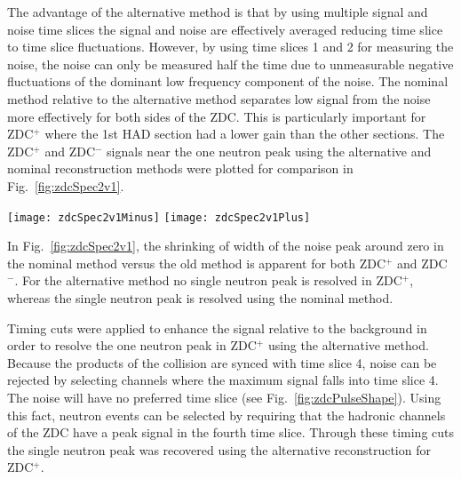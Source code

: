       The advantage of the alternative method is that by using multiple signal
        and noise time slices the signal and noise are effectively averaged
        reducing time slice to time slice fluctuations.
      However, by using time slices 1 and 2 for measuring the noise, the noise
        can only be measured half the time due to unmeasurable negative 
        fluctuations of the dominant low frequency component of the noise.
      The nominal method relative to the alternative method separates low signal
        from the noise more effectively  for both sides of the ZDC.
      This is particularly important for ZDC$^{+}$ where the 1st HAD section
        had a lower gain than the other sections. 
      The ZDC$^{+}$ and ZDC$^{-}$ signals near the one neutron peak using the
        alternative and nominal reconstruction methods were plotted for comparison in 
        Fig.~\ref{fig:zdcSpec2v1}.
      \DIFdelbegin %
\DIFdelendFL \DIFaddbeginFL \begin{figure*}[!Hhbt]
        \DIFaddendFL \centering
        \DIFdelbeginFL %
\DIFdelendFL \DIFaddbeginFL \texttt{[image: zdcSpec2v1Minus]}
        \texttt{[image: zdcSpec2v1Plus]}
        \DIFaddendFL \caption{Comparison of the nominal (red) ZDC reconstruction 
          method and the alternative (blue) method for ZDC$^{-}$ (left) and 
          ZDC$^{+}$ (right).}
        \label{fig:zdcSpec2v1}
      \DIFdelbeginFL %
\DIFdelend \DIFaddbegin \end{figure*}
      \DIFaddend In Fig.~\ref{fig:zdcSpec2v1}, the shrinking of width of the noise peak 
        around zero in the nominal method versus the old method is apparent for
        both ZDC$^{+}$ and ZDC$^{-}$.
      For the alternative method no single neutron peak is resolved in ZDC$^{+}$,
        whereas the single neutron peak is resolved using the nominal method. 

      Timing cuts were applied to enhance the signal relative to the background
        in order to resolve the one neutron peak in ZDC$^{+}$ using the 
        alternative method. 
      Because the products of the collision are synced with time slice 4, noise
        can be rejected by selecting channels where the maximum signal falls 
        into time slice 4.
      The noise will have no preferred time slice (see Fig.~\ref{fig:zdcPulseShape}). 
      Using this fact, neutron events can be selected by requiring that the
        hadronic channels of the ZDC have a peak signal in the fourth time 
        slice.
      Through these timing cuts the single neutron peak was recovered using the
       alternative reconstruction for ZDC$^{+}$.

